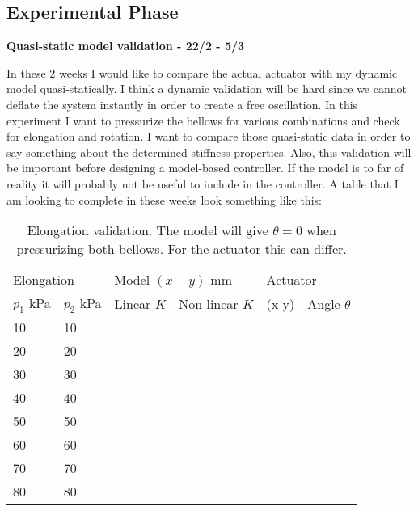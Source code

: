 \subsection{Experimental Phase}


\textbf{Quasi-static model validation - 22/2 - 5/3}

In these 2 weeks I would like to compare the actual actuator with my dynamic model quasi-statically. I think a dynamic validation will be hard since we cannot deflate the system instantly in order to create a free oscillation. In this experiment I want to pressurize the bellows for various combinations and check for elongation and rotation. I want to compare those quasi-static data in order to say something about the determined stiffness properties. Also, this validation will be important before designing a model-based controller. If the model is to far of reality it will probably not be useful to include in the controller. A table that I am looking to complete in these weeks look something like this:




\begin{table}[H]
    \centering
    \begin{tabular}{|l|l|l|l|l|l|}
    \hline
    \multicolumn{2}{|l|}{Elongation}   & \multicolumn{2}{l|}{Model $(x-y)$ mm}      &  \multicolumn{2}{l|}{Actuator }  \\  \cline{1-6}
      $p_1$ kPa & $p_2$ kPa  &      Linear $K$ & Non-linear $K$         &         (x-y) &  Angle $\theta$       \\ \hline
         10     &    10      &              &                           &               &      \\
         20     &    20      &              &                           &               &      \\
         30     &    30      &              &                           &               &      \\
         40     &    40      &              &                           &               &      \\
         50     &    50      &              &                           &               &      \\
         60     &    60      &              &                           &               &      \\         
         70     &    70      &              &                           &               &      \\
         80     &    80      &              &                           &               &      \\
    \hline
\end{tabular}
    \caption{Elongation validation. The model will give $\theta = 0$ when pressurizing both bellows. For the actuator this can differ.}
    \label{tab:elongat}
\end{table}



